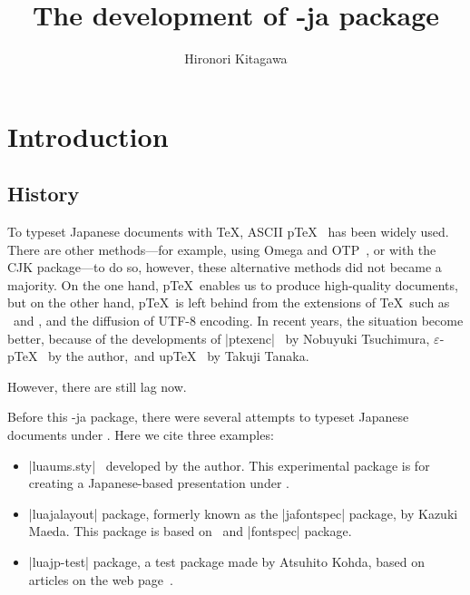\documentclass{ajt}
\title{The development of \LuaTeX-ja package}
\author{Hironori Kitagawa}
\begin{document}
\maketitle

\section{Introduction}
\subsection{History}
To typeset Japanese documents with \TeX, ASCII p\TeX~\cite{ptex} has
been widely used.  There are other methods---for example, using Omega
and OTP~\cite{omegaj}, or with the CJK package---to do so, however,
these alternative methods did not became a majority. On the one hand,
p\TeX\ enables us to produce high-quality documents, but on the other
hand, p\TeX\ is left behind from the extensions of \TeX\ such as \eTeX\
and \pdfTeX, and the diffusion of UTF-8 encoding.  In recent years, the
situation become better, because of the developments of |ptexenc|~\cite{ptexenc} by Nobuyuki Tsuchimura, 
$\varepsilon$-p\TeX~\cite{eptex} by the author,~and
up\TeX~\cite{uptex} by Takuji Tanaka.

However, there are still lag now. 


Before this \LuaTeX-ja package, there were several attempts to typeset Japanese documents under \LuaTeX.
Here we cite three examples:
\begin{itemize}
\item |luaums.sty|~\cite{luaums} developed by the author. This experimental package is for creating a Japanese-based presentation under \LuaTeX.
\item |luajalayout| package\cite{luajalayout}, formerly known as the |jafontspec| package, by Kazuki Maeda. 
This package is based on \LaTeXe\ and |fontspec| package.
\item |luajp-test| package\cite{luajp-test}, a test package made by Atsuhito Kohda, based on articles on the web page~\cite{joylua}.
\end{itemize}
\end{document}
